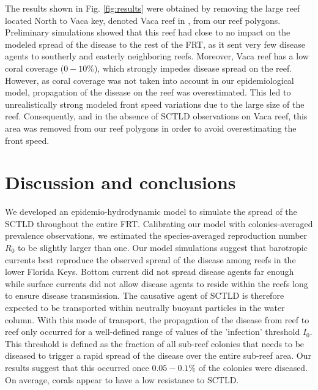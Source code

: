 \documentclass[utf8]{frontiersSCNS}
\begin{document}
The results shown in Fig. \ref{fig:results} were obtained by removing the large reef located North to Vaca key, denoted Vaca reef in \cite{frys20}, from our reef polygons. Preliminary simulations showed that this reef had close to no impact on the modeled spread of the disease to the rest of the FRT, as it sent very few disease agents to southerly and easterly neighboring reefs. Moreover, Vaca reef has a low coral coverage ($0-10\%$), which strongly impedes disease spread on the reef. However, as coral coverage was not taken into account in our epidemiological model, propagation of the disease on the reef was overestimated. This led to unrealistically strong modeled front speed variations due to the large size of the reef. Consequently, and in the absence of SCTLD observations on Vaca reef, this area was removed from our reef polygons in order to avoid overestimating the front speed.



\section{Discussion and conclusions}


We developed an epidemio-hydrodynamic model to simulate the spread of the SCTLD throughout the entire FRT. Calibrating our model with colonies-averaged prevalence observations, we estimated the species-averaged reproduction number $R_0$ to be slightly larger than one. Our model simulations suggest that barotropic currents best reproduce the observed spread of the disease among reefs in the lower Florida Keys. Bottom current did not spread disease agents far enough while surface currents did not allow disease agents to reside within the reefs long to ensure disease transmission. The causative agent of SCTLD is therefore expected to be transported within neutrally buoyant particles in the water column. With this mode of transport, the propagation of the disease from reef to reef only occurred for a well-defined range of values of the 'infection' threshold $I_0$. This threshold is defined as the fraction of all sub-reef colonies that needs to be diseased to trigger a rapid spread of the disease over the entire sub-reef area. Our results suggest that this occurred once $0.05-0.1\%$ of the colonies were diseased. On average, corals appear to have a low resistance to SCTLD.
\end{document}
